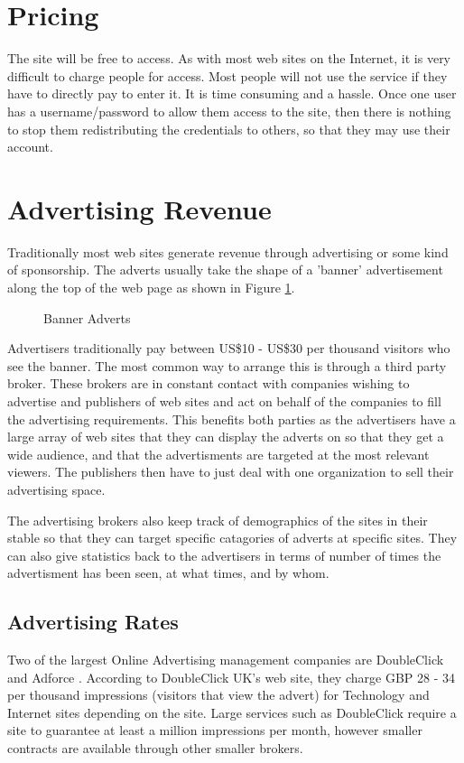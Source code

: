 \section{Pricing}

The site will be free to access.  As with most web sites on the Internet, it is very difficult to charge people for access.  Most people will not use the service if they have to directly pay to enter it.  It is time consuming and a hassle.  Once one user has a username/password to allow them access to the site, then there is nothing to stop them redistributing the credentials to others, so that they may use their account.

\section{Advertising Revenue}

Traditionally most web sites generate revenue through advertising or some kind of sponsorship. The adverts usually take the shape of a 'banner' advertisement along the top of the web page as shown in Figure \ref{fig:banner}.

\begin{figure}[!ht]
  \begin{center}
    \caption{Banner Adverts}
    \label{fig:banner}
  \end{center}
\end{figure}


Advertisers traditionally pay between US\$10 - US\$30 per thousand visitors who see the banner.  The most common way to arrange this is through a third party broker.  These brokers are in constant contact with companies wishing to advertise and publishers of web sites and act on behalf of the companies to fill the advertising requirements.  This benefits both parties as the advertisers have a large array of web sites that they can display the adverts on so that they get a wide audience, and that the advertisments are targeted at the most relevant viewers.  The publishers then have to just deal with one organization to sell their advertising space.

The advertising brokers also keep track of demographics of the sites in their stable so that they can target specific catagories of adverts at specific sites.  They can also give statistics back to the advertisers in terms of number of times the advertisment has been seen, at what times, and by whom. 

\subsection{Advertising Rates}
Two of the largest Online Advertising management companies are DoubleClick \cite{www:doubleclick} and Adforce \cite{www:adforce}.  According to DoubleClick UK's web site, they charge GBP 28 - 34 per thousand impressions (visitors that view the advert) for Technology and Internet sites depending on the site.  Large services such as DoubleClick require a site to guarantee at least a million impressions per month, however smaller contracts are available through other smaller brokers.

